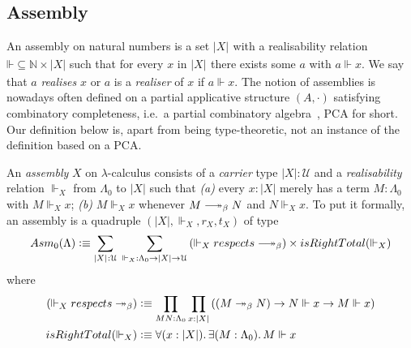 \documentclass[a4paper,UKenglish,numberwithinsect,cleveref,thm-restate]{lipics-v2021}
\numberwithin{equation}{section}
\newcommand{\tproj}[3][]{\mathopen{}\left|#3\right|_{#2}^{#1}\mathclose{}}
\newcommand{\bproj}[1]{\tproj{}{#1}}
\newcommand{\Asm}{\mathsf{Asm}}
\newcommand{\defeq}{\vcentcolon\equiv}
\newcommand{\Univ}{\mathcal{U}}
\DeclareRobustCommand\longtwoheadrightarrow{\relbar\joinrel\twoheadrightarrow}
\newcommand{\reduce}{\longtwoheadrightarrow_{\beta}}
\theoremstyle{plain}
\begin{document}
\subsection{Assembly}
An assembly on natural numbers is a set $\bproj{X}$ with a realisability relation $\mathord{\Vdash} \subseteq \mathbb{N} \times |X|$ such that for every $x$ in $\bproj{X}$ there exists some $a$ with $a \Vdash x$.
We say that $a$ \emph{realises} $x$ or $a$ is a \emph{realiser} of $x$ if $a \Vdash x$.
The notion of assemblies is nowadays often defined on a partial applicative structure $(A, \cdot)$ satisfying combinatory completeness, i.e.\ a partial combinatory algebra~\cite{Oosten2008}, PCA for short.
Our definition below is, apart from being type-theoretic, not an instance of the definition based on a PCA.
\begin{definition}\label{def:assembly}
  An \emph{assembly} $X$ on $\lambda$-calculus consists of a \emph{carrier} type $|X| : \Univ$ and a \emph{realisability} relation ${\Vdash_X}$ from $\Lambda_0$ to $|X|$ such that
  \emph{(a)} every $x : |X|$ merely has a term $M : \Lambda_0$ with $M \Vdash_X x$;
  \emph{(b)} $M \Vdash_X x$ whenever $M \reduce N$ and $N \Vdash_X x$.
  To put it formally, an assembly is a quadruple $(|X|, \Vdash_X, r_X, t_X)$ of type
  \[
    \Asm_0(\Lambda) \defeq \sum_{\bproj{X} : {\Univ}}\;\sum_{\mathord{\Vdash_X}:\Lambda_0 \to |X| \to \Univ} 
    \left(\mathord{\Vdash_X}\;\mathsf{respects}\;\mathord{\reduce}\right)
      \times \mathsf{isRightTotal}({\Vdash_X})
  \]
  where
  \begin{align}
    \left(\mathord{\Vdash_X}\;\mathsf{respects}\;\mathord{\twoheadrightarrow_\beta}\right) & \defeq\prod_{M N : \Lambda_0} \prod_{x : |X|} \left( \left(M \twoheadrightarrow_ \beta N\right) \to N \Vdash x \to M \Vdash x \right) \label{def:respect-reduction} \\      
    \mathsf{isRightTotal}(\Vdash_X) & \defeq \forall (x : |X|).\, \exists (M : \Lambda_0).\, M \Vdash x
    \label{def:right-total}
  \end{align}
\end{definition}
\end{document}
